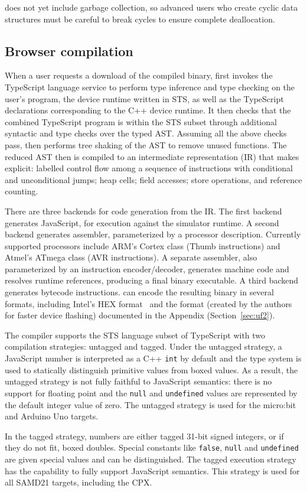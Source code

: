 \MC does not yet include garbage collection, so advanced users who create cyclic
data structures must be careful to break cycles to ensure complete deallocation.

\subsection{Browser compilation}

When a user requests a download of the compiled binary, \MC first invokes the TypeScript language service to perform type inference and type checking on the
user's program, the device runtime written in STS, as well as the TypeScript declarations
corresponding to the C++ device runtime. It then checks that the
combined TypeScript program is within the STS subset through additional syntactic and type checks over the typed AST.  Assuming all the
above checks pass, \MC then performs tree shaking of the AST to remove unused functions.
The reduced AST then is compiled to an intermediate representation (IR) that makes explicit: labelled control
flow among a sequence of instructions with conditional and unconditional jumps; heap cells; field accesses; store operations,
and reference counting.

There are three backends for code generation from the IR. The first backend generates JavaScript,
for execution against the simulator runtime.  A second backend generates assembler, parameterized by a
processor description.  Currently supported processors include ARM's Cortex class (Thumb instructions)
and Atmel's ATmega class (AVR instructions). A separate assembler, also parameterized by an instruction
encoder/decoder, generates machine code and resolves runtime references, producing a final binary executable. A third backend generates bytecode instructions.
\MC can encode the resulting binary in several formats,
including Intel's HEX format~\cite{IntelHEX} and the \UF format (created by
the authors for faster device flashing) documented in the Appendix (Section~\ref{sec:uf2}).

\label{sec:untagged-tagged}
The \MC compiler supports the STS language subset of TypeScript
with two compilation strategies: untagged and tagged. Under the untagged strategy,
a JavaScript number is interpreted as a C++ \texttt{int} by default and the type system is used
to statically distinguish primitive values from boxed values. As a result, the untagged
strategy is not fully faithful to JavaScript semantics: there is no support for floating
point and the \texttt{null} and \texttt{undefined} values are represented by the default integer value of zero. The untagged strategy is used for the micro:bit and Arduino Uno targets.

In the tagged strategy, numbers are either tagged 31-bit signed integers, or if they do not fit,
boxed doubles. Special constants like \texttt{false}, \texttt{null} and \texttt{undefined} are given special values
and can be distinguished. The tagged execution strategy has the capability to fully support
JavaScript semantics. This strategy is used for all SAMD21 targets, including the CPX.
